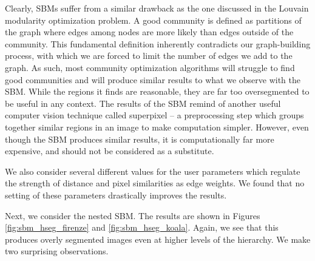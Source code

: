 \documentclass[conference]{IEEEtran}
\begin{document}
Clearly, SBMs suffer from a similar drawback as the one discussed in the Louvain modularity optimization problem. A good community is defined as partitions of the graph where edges among nodes are more likely than edges outside of the community. This fundamental definition inherently contradicts our graph-building process, with which we are forced to limit the number of edges we add to the graph. As such, most community optimization algorithms will struggle to find good communities and will produce similar results to what we observe with the SBM. While the regions it finds are reasonable, they are far too oversegmented to be useful in any context. The results of the SBM remind of another useful computer vision technique called superpixel -- a preprocessing step which groups together similar regions in an image to make computation simpler. However, even though the SBM produces similar results, it is computationally far more expensive, and should not be considered as a substitute.

We also consider several different values for the user parameters which regulate the strength of distance and pixel similarities as edge weights. We found that no setting of these parameters drastically improves the results.

Next, we consider the nested SBM. The results are shown in Figures \ref{fig:sbm_hseg_firenze} and \ref{fig:sbm_hseg_koala}. Again, we see that this produces overly segmented images even at higher levels of the hierarchy. We make two surprising observations.
\end{document}
